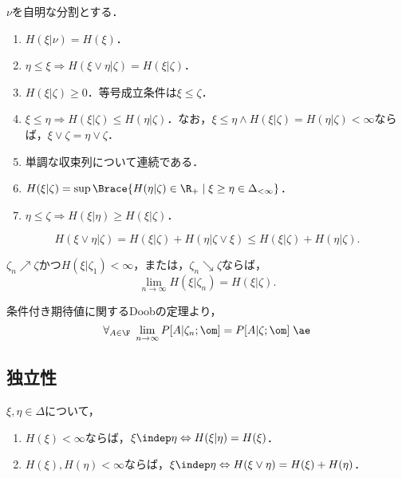 \documentclass[uplatex,dvipdfmx]{jsreport}
\begin{document}
\begin{proposition}
    $\nu$を自明な分割とする．
    \begin{enumerate}
        \item $H(\xi|\nu)=H(\xi)$．
        \item $\eta\le\xi\Rightarrow H(\xi\lor\eta|\zeta)=H(\xi|\zeta)$．
        \item $H(\xi|\zeta)\ge0$．等号成立条件は$\xi\le\zeta$．
        \item $\xi\le\eta\Rightarrow H(\xi|\zeta)\le H(\eta|\zeta)$．なお，$\xi\le\eta\land H(\xi|\zeta)=H(\eta|\zeta)<\infty$ならば，$\xi\lor\zeta=\eta\lor\zeta$．
        \item 単調な収束列について連続である．
        \item $H(\xi|\zeta)=\sup\Brace{H(\eta|\zeta)\in\R_+\mid\xi\ge\eta\in\Delta_{<\infty}}$．
        \item $\eta\le\zeta\Rightarrow H(\xi|\eta)\ge H(\xi|\zeta)$．
    \end{enumerate}
\end{proposition}

\begin{proposition}
    \[H(\xi\lor\eta|\zeta)=H(\xi|\zeta)+H(\eta|\zeta\lor\xi)\le H(\xi|\zeta)+H(\eta|\zeta).\]
\end{proposition}

\begin{proposition}
    $\zeta_n\nearrow\zeta$かつ$H(\xi|\zeta_1)<\infty$，または，$\zeta_n\searrow\zeta$ならば，
    \[\lim_{n\to\infty}H(\xi|\zeta_n)=H(\xi|\zeta).\]
\end{proposition}
\begin{Proof}
    条件付き期待値に関するDoobの定理より，
    \[\forall_{A\in\F}\;\lim_{n\to\infty}P[A|\zeta_n;\om]=P[A|\zeta;\om]\;\ae\]
\end{Proof}

\subsection{独立性}

\begin{proposition}
    $\xi,\eta\in\Delta$について，
    \begin{enumerate}
        \item $H(\xi)<\infty$ならば，$\xi\indep\eta\Leftrightarrow H(\xi|\eta)=H(\xi)$．
        \item $H(\xi),H(\eta)<\infty$ならば，$\xi\indep\eta\Leftrightarrow H(\xi\lor\eta)=H(\xi)+H(\eta)$．
    \end{enumerate}
\end{proposition}
\end{document}
